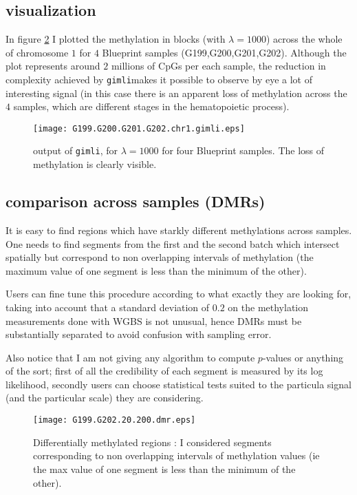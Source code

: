 \documentclass[11pt]{amsart}
\newcommand{\gimli}{\texttt{gimli}}
\begin{document}
\subsection{visualization}

In figure \ref{ex1} I plotted the methylation in blocks (with $\lambda=1000$) 
across the whole of chromosome $1$ for $4$ Blueprint samples
(G199,G200,G201,G202). Although the plot represents around $2$ millions of 
CpGs per each sample, the reduction in complexity achieved by \gimli makes it 
possible to observe by eye a lot of interesting signal (in this case there is 
an apparent loss of methylation across the $4$ samples, which are different 
stages in the hematopoietic process).

\begin{figure}\label{ex1}
\texttt{[image: G199.G200.G201.G202.chr1.gimli.eps]}
\caption{output of \gimli, for $\lambda=1000$ for four Blueprint samples. The loss of
methylation is clearly visible.}
\end{figure}

\subsection{comparison across samples (DMRs)}

It is easy to find regions which have starkly different 
methylations across samples. One needs to find segments 
from the first and the second batch which intersect spatially
but correspond to non overlapping intervals of methylation 
(the maximum value of one 
segment is less than the minimum of the other).

Users can fine tune this procedure according to what exactly they 
are looking for, taking into account that a standard deviation of $0.2$
on the methylation measurements done with WGBS is not unusual, hence
DMRs must be substantially separated to avoid confusion with sampling error.

Also notice that I am not giving any algorithm to compute $p$-values
or anything of the sort; first of all the credibility of each segment
is measured by its log likelihood, secondly users can choose statistical
tests suited to the particula signal (and the particular scale)
they are considering.

\begin{figure}\label{ex1}
\texttt{[image: G199.G202.20.200.dmr.eps]}
\caption{Differentially methylated regions : I considered segments corresponding to
non overlapping intervals of methylation values (ie the max value of one 
segment is less than the minimum of the other).}
\end{figure}
\end{document}
